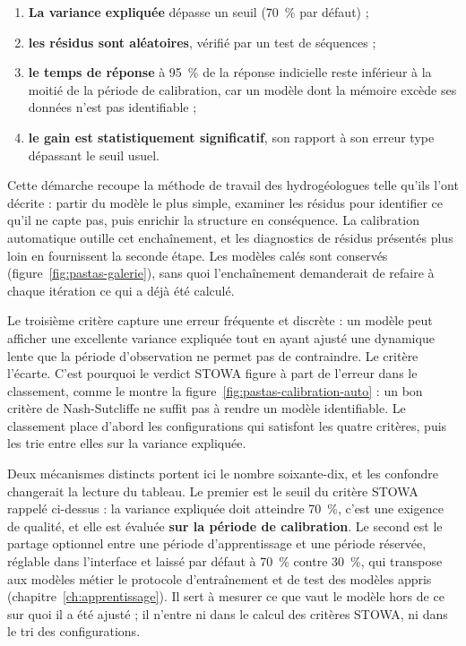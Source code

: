 \begin{enumerate}
  \item \textbf{La variance expliquée} dépasse un seuil (\SI{70}{\percent} par défaut) ;
  \item \textbf{les résidus sont aléatoires}, vérifié par un test de séquences ;
  \item \textbf{le temps de réponse} à \SI{95}{\percent} de la réponse indicielle reste inférieur
  à la moitié de la période de calibration, car un modèle dont la mémoire excède ses
  données n'est pas identifiable ;
  \item \textbf{le gain est statistiquement significatif}, son rapport à son erreur type
  dépassant le seuil usuel.
\end{enumerate}

Cette démarche recoupe la méthode de travail des hydrogéologues telle qu'ils l'ont décrite :
partir du modèle le plus simple, examiner les résidus pour identifier ce qu'il ne capte pas,
puis enrichir la structure en conséquence. La calibration automatique outille cet enchaînement,
et les diagnostics de résidus présentés plus loin en fournissent la seconde étape. Les modèles
calés sont conservés (figure~\ref{fig:pastas-galerie}), sans quoi l'enchaînement demanderait de
refaire à chaque itération ce qui a déjà été calculé.

Le troisième critère capture une erreur fréquente et discrète :
un modèle peut afficher une excellente variance expliquée tout en ayant ajusté une dynamique
lente que la période d'observation ne permet pas de contraindre. Le critère l'écarte. C'est
pourquoi le verdict STOWA figure à part de l'erreur dans le classement, comme le montre la
figure~\ref{fig:pastas-calibration-auto} : un bon critère de Nash-Sutcliffe ne suffit pas à
rendre un modèle identifiable. Le classement place d'abord les configurations qui satisfont les
quatre critères, puis les trie entre elles sur la variance expliquée.

Deux mécanismes distincts portent ici le nombre soixante-dix, et les confondre changerait la
lecture du tableau. Le premier est le seuil du critère STOWA rappelé ci-dessus : la variance
expliquée doit atteindre \SI{70}{\percent}, c'est une exigence de qualité, et elle est évaluée
\textbf{sur la période de calibration}. Le second est le partage optionnel entre une période
d'apprentissage et une période réservée, réglable dans l'interface et laissé par défaut à
\SI{70}{\percent} contre \SI{30}{\percent}, qui transpose aux modèles métier le protocole
d'entraînement et de test des modèles appris (chapitre~\ref{ch:apprentissage}). Il sert à
mesurer ce que vaut le modèle hors de ce sur quoi il a été ajusté ; il n'entre ni dans le calcul
des critères STOWA, ni dans le tri des configurations.

